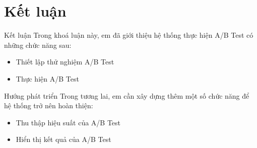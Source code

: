 \section{Kết luận}


\begin{frame}{Kết luận}
	Trong khoá luận này, em đã giới thiệu hệ thống thực hiện A/B Test có những chức năng sau:
	\begin{itemize}
		\item Thiết lập thử nghiệm A/B Test
		\item Thực hiện A/B Test
	\end{itemize}
\end{frame}


\begin{frame}{Hướng phát triển}
    Trong tương lai, em cần xây dựng thêm một số chức năng để hệ thống trở nên hoàn thiện:
	\begin{itemize}
		\item Thu thập hiệu suất của A/B Test
		\item Hiển thị kết quả của A/B Test
	\end{itemize}
\end{frame}
